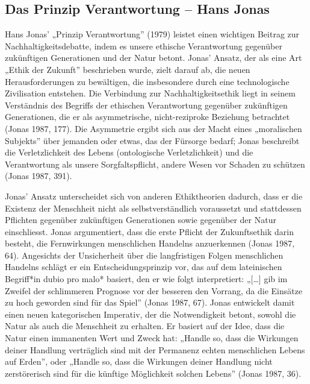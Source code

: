 \documentclass[
  nswissgerman,
  a4paper,
  DIV=11,
  numbers=noendperiod,
  oneside,
  openany]{scrreprt}
\begin{document}
\subsection{Das Prinzip Verantwortung -- Hans
Jonas}\label{das-prinzip-verantwortung-hans-jonas}

Hans Jonas' „Prinzip Verantwortung'' (1979) leistet einen wichtigen
Beitrag zur Nachhaltigkeitsdebatte, indem es unsere ethische
Verantwortung gegenüber zukünftigen Generationen und der Natur betont.
Jonas' Ansatz, der als eine Art „Ethik der Zukunft'' beschrieben wurde,
zielt darauf ab, die neuen Herausforderungen zu bewältigen, die
insbesondere durch eine technologische Zivilisation entstehen. Die
Verbindung zur Nachhaltigkeitsethik liegt in seinem Verständnis des
Begriffs der ethischen Verantwortung gegenüber zukünftigen Generationen,
die er als asymmetrische, nicht-reziproke Beziehung betrachtet (Jonas
1987, 177). Die Asymmetrie ergibt sich aus der Macht eines „moralischen
Subjekts'' über jemanden oder etwas, das der Fürsorge bedarf; Jonas
beschreibt die Verletzlichkeit des Lebens (ontologische Verletzlichkeit)
und die Verantwortung als unsere Sorgfaltspflicht, andere Wesen vor
Schaden zu schützen (Jonas 1987, 391).

Jonas' Ansatz unterscheidet sich von anderen Ethiktheorien dadurch, dass
er die Existenz der Menschheit nicht als selbstverständlich voraussetzt
und stattdessen Pflichten gegenüber zukünftigen Generationen sowie
gegenüber der Natur einschliesst. Jonas argumentiert, dass die erste
Pflicht der Zukunftsethik darin besteht, die Fernwirkungen menschlichen
Handelns anzuerkennen (Jonas 1987, 64). Angesichts der Unsicherheit über
die langfristigen Folgen menschlichen Handelns schlägt er ein
Entscheidungsprinzip vor, das auf dem lateinischen Begriff*in dubio pro
malo* basiert, den er wie folgt interpretiert: „{[}\ldots{]} gib im
Zweifel der schlimmeren Prognose vor der besseren den Vorrang, da die
Einsätze zu hoch geworden sind für das Spiel'' (Jonas 1987, 67). Jonas
entwickelt damit einen neuen kategorischen Imperativ, der die
Notwendigkeit betont, sowohl die Natur als auch die Menschheit zu
erhalten. Er basiert auf der Idee, dass die Natur einen immanenten Wert
und Zweck hat: „Handle so, dass die Wirkungen deiner Handlung
verträglich sind mit der Permanenz echten menschlichen Lebens auf
Erden'', oder „Handle so, dass die Wirkungen deiner Handlung nicht
zerstörerisch sind für die künftige Möglichkeit solchen Lebens'' (Jonas
1987, 36).
\end{document}
